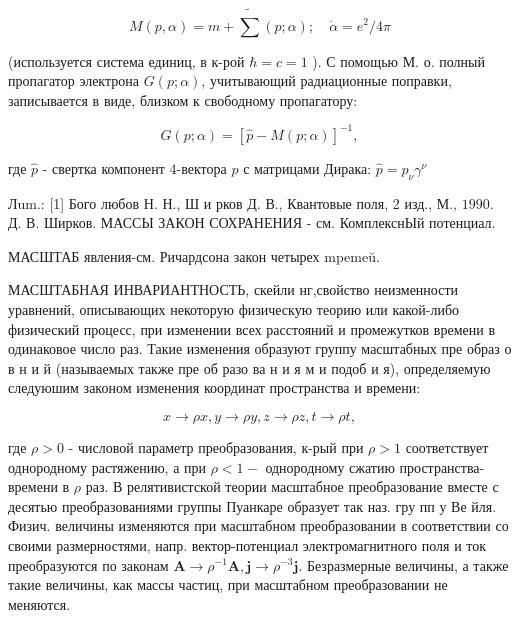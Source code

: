 \documentclass[10pt]{article}
\begin{document}
\[

M(p, \alpha)=m+\tilde{\sum}(p ; \alpha) ; \quad \dot{\alpha}=e^{2} / 4 \pi

\]



(используется система единиц, в к-рой $\hbar=c=1$ ). С помощью М. о. полный пропагатор электрона $G(p ; \alpha)$, учитывающий радиационные поправки, записывается в виде, близком к свободному пропагатору:



\[

G(p ; \alpha)=[\hat{p}-M(p ; \alpha)]^{-1},

\]



где $\hat{p}$ - свертка компонент 4-вектора $p$ с матрицами Дирака: $\hat{p}=p_{\nu} \gamma^{\nu}$



Лum.: [1] Бого любов Н. Н., Ш и рков Д. В., Квантовые поля, 2 изд., М., $1990 . \quad$ Д. В. Ширков. МАССЫ ЗАКОН СОХРАНЕНИЯ - см. КомплекснЫй потенциал.



МАСШТАБ явления-см. Ричардсона закон четырех mpemeŭ.



МАСШТАБНАЯ ИНВАРИАНТНОСТЬ, скейли нг,свойство неизменности уравнений, описывающих некоторую физическую теорию или какой-либо физический процесс, при изменении всех расстояний и промежутков времени в одинаковое число раз. Такие изменения образуют группу масштабных пре образ о в н и й (называемых также пре об разо ва н и я м и подоб и я), определяемую следуюшим законом изменения координат пространства и времени:



\[

x \rightarrow \rho x, y \rightarrow \rho y, z \rightarrow \rho z, t \rightarrow \rho t,

\]



где $\rho>0$ - числовой параметр преобразования, к-рый при $\rho>1$ соответствует однородному растяжению, а при $\rho<1-$ однородному сжатию пространства-времени в $\rho$ раз. В релятивистской теории масштабное преобразование вместе с десятью преобразованиями группы Пуанкаре образует так наз. гру пп у Ве йля. Физич. величины изменяются при масштабном преобразовании в соответствии со своими размерностями, напр. вектор-потенциал электромагнитного поля и ток преобразуются по законам $\boldsymbol{A} \rightarrow \rho^{-1} \boldsymbol{A}, \boldsymbol{j} \rightarrow \rho^{-3} \boldsymbol{j}$. Безразмерные величины, а также такие величины, как массы частиц, при масштабном преобразовании не меняются.
\end{document}
